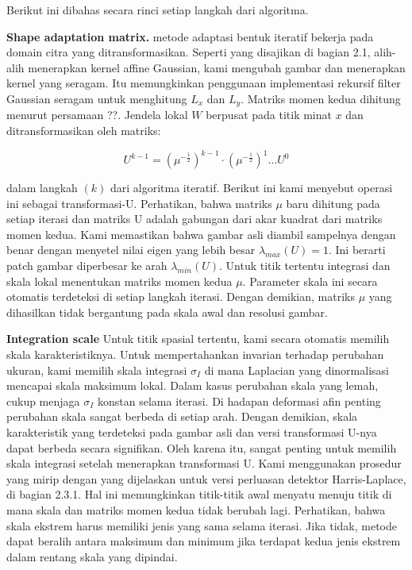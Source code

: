 Berikut ini dibahas secara rinci setiap langkah dari algoritma.

\textbf{Shape adaptation matrix.} metode adaptasi bentuk iteratif bekerja pada domain citra yang ditransformasikan. Seperti yang disajikan di bagian 2.1, alih-alih menerapkan kernel affine Gaussian, kami mengubah gambar dan menerapkan kernel yang seragam. Itu memungkinkan penggunaan implementasi rekursif filter Gaussian seragam untuk menghitung \(L_{x}\) dan \(L_{y}\). Matriks momen kedua dihitung menurut persamaan ??. Jendela lokal \(W\) berpusat pada titik minat \(x\) dan ditransformasikan oleh matriks:

\begin{equation}
  U^{k-1} = (\mu^{-\frac{1}{2}})^{k-1} \cdot (\mu^{-\frac{1}{2}})^{1} \dots U^{0}
\end{equation}

dalam langkah \((k)\) dari algoritma iteratif. 
Berikut ini kami menyebut operasi ini sebagai transformasi-U. Perhatikan, bahwa matriks \(\mu\) 
baru dihitung pada setiap iterasi dan matriks U adalah gabungan dari akar kuadrat dari matriks momen kedua. 
Kami memastikan bahwa gambar asli diambil sampelnya dengan benar dengan menyetel nilai eigen yang lebih besar \(\lambda_{max}(U)=1\). Ini berarti patch gambar diperbesar ke arah \(\lambda_{min}(U)\). Untuk titik tertentu integrasi dan skala lokal menentukan matriks momen kedua \(\mu\). Parameter skala ini secara otomatis terdeteksi di setiap langkah iterasi. Dengan demikian, matriks \(\mu\) yang dihasilkan tidak bergantung pada skala awal dan resolusi gambar.

\textbf{Integration scale} Untuk titik spasial tertentu, kami secara otomatis memilih skala karakteristiknya. Untuk mempertahankan invarian terhadap perubahan ukuran, kami memilih skala integrasi \(\sigma_{I}\) di mana Laplacian yang dinormalisasi mencapai skala maksimum lokal. Dalam kasus perubahan skala yang lemah, cukup menjaga \(\sigma_{I}\) konstan selama iterasi. Di hadapan deformasi afin penting perubahan skala sangat berbeda di setiap arah. Dengan demikian, skala karakteristik yang terdeteksi pada gambar asli dan versi transformasi U-nya dapat berbeda secara signifikan. Oleh karena itu, sangat penting untuk memilih skala integrasi setelah menerapkan transformasi U. Kami menggunakan prosedur yang mirip dengan yang dijelaskan untuk versi perluasan detektor Harris-Laplace, di bagian 2.3.1. Hal ini memungkinkan titik-titik awal menyatu menuju titik di mana skala dan matriks momen kedua tidak berubah lagi. Perhatikan, bahwa skala ekstrem harus memiliki jenis yang sama selama iterasi. Jika tidak, metode dapat beralih antara maksimum dan minimum jika terdapat kedua jenis ekstrem dalam rentang skala yang dipindai.


